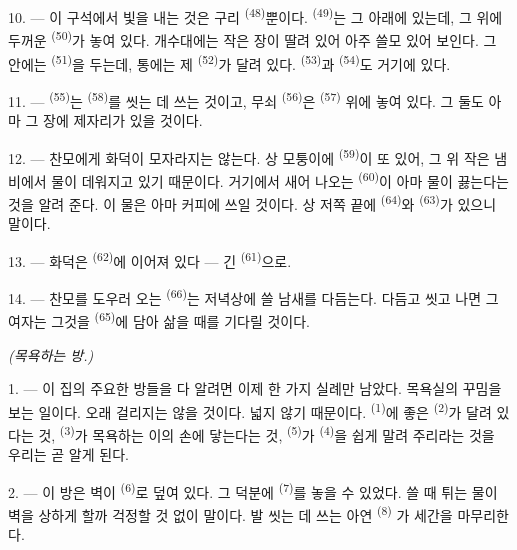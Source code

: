 10. --- 이 구석에서 빛을 내는 것은 구리  \textsuperscript{(48)}뿐이다.
 \textsuperscript{(49)}는 그 아래에 있는데, 그 위에 두꺼운
 \textsuperscript{(50)}가 놓여 있다. 개수대에는 작은 장이 딸려 있어 아주
쓸모 있어 보인다. 그 안에는  \textsuperscript{(51)}을 두는데, 통에는
제  \textsuperscript{(52)}가 달려 있다. 
\textsuperscript{(53)}과  \textsuperscript{(54)}도 거기에 있다.

\VUsaut{4.0mm}
\VUsaut{3.0mm}

11. ---  \textsuperscript{(55)}는  \textsuperscript{(58)}를
씻는 데 쓰는 것이고, 무쇠  \textsuperscript{(56)}은 
\textsuperscript{(57)} 위에 놓여 있다. 그 둘도 아마 그 장에 제자리가 있을 것이다.

12. --- 찬모에게 화덕이 모자라지는 않는다. 상 모퉁이에 
\textsuperscript{(59)}이 또 있어, 그 위 작은 냄비에서 물이 데워지고 있기 때문이다.
거기에서 새어 나오는  \textsuperscript{(60)}이 아마 물이 끓는다는 것을 알려
준다. 이 물은 아마 커피에 쓰일 것이다. 상 저쪽 끝에 
\textsuperscript{(64)}와  \textsuperscript{(63)}가 있으니 말이다.

13. --- 화덕은  \textsuperscript{(62)}에 이어져 있다 — 긴
 \textsuperscript{(61)}으로.

14. --- 찬모를 도우러 오는  \textsuperscript{(66)}는 저녁상에 쓸 남새를
다듬는다. 다듬고 씻고 나면 그 여자는 그것을  \textsuperscript{(65)}에 담아
삶을 때를 기다릴 것이다.

\VUsaut{4.0mm}
{\centering\fontsize{10.2pt}{10.2pt}\selectfont{} \textit{(목욕하는 방.)}\par}
\VUsaut{3.0mm}

1. --- 이 집의 주요한 방들을 다 알려면 이제 한 가지 실례만 남았다. 목욕실의 꾸밈을 보는
일이다. 오래 걸리지는 않을 것이다. 넓지 않기 때문이다. 
\textsuperscript{(1)}에 좋은  \textsuperscript{(2)}가 달려 있다는
것,  \textsuperscript{(3)}가 목욕하는 이의 손에 닿는다는 것,
 \textsuperscript{(5)}가  \textsuperscript{(4)}을 쉽게
말려 주리라는 것을 우리는 곧 알게 된다.

2. --- 이 방은 벽이  \textsuperscript{(6)}로 덮여 있다. 그 덕분에
 \textsuperscript{(7)}를 놓을 수 있었다. 쓸 때 튀는 물이 벽을 상하게
할까 걱정할 것 없이 말이다. 발 씻는 데 쓰는 아연  \textsuperscript{(8)}
가 세간을 마무리한다.

\VUsaut{6.0mm}
\VUfilet{22mm}

